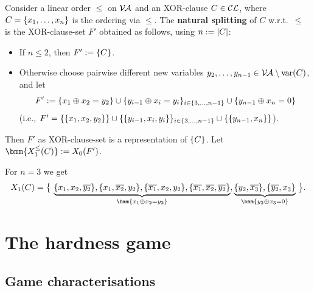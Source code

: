 \documentclass[]{book}
\begin{document}
\begin{defi}\label{def:1softxor}
  \cite{h8} Consider a linear order $\le$ on $\mathcal{V\hspace{-0.1em}A}$ and an XOR-clause $C \in \mathcal{CL}$, where $C = \{ x_1,\dots,x_n \}$ is the ordering via $\le$. 
  The \textbf{natural splitting} of $C$ w.r.t.\ $\le$ is the XOR-clause-set $F'$ obtained as follows, using $n := \lvert C \rvert$:
  \begin{itemize}
  \item If $n \le 2$, then $F' := \{ C \}$.
  \item Otherwise choose pairwise different new variables $y_2, \dots, y_{n-1} \in \mathcal{V\hspace{-0.1em}A} \setminus \operatorname{var}(C)$, and let
    \begin{displaymath}
      F' := \{ x_1 \oplus x_2 = y_2 \} \cup \{ y_{i-1} \oplus x_i = y_i \}_{i \in \{ 3, \dots, n-1 \}} \cup \{ y_{n-1} \oplus x_n = 0 \}
    \end{displaymath}
    (i.e., $F' = \{ \{ x_1,x_2,y_2 \} \} \cup \{ \{ y_{i-1},x_i,y_{i} \} \}_{i \in \{ 3, \dots, n-1 \}} \cup \{ \{ y_{n-1},x_n \} \}$).
  \end{itemize}
  Then $F'$ as XOR-clause-set is a representation of $\{ C \}$. Let $\bmm{X_1^{\le}(C)} := X_0(F')$.
\end{defi}

\begin{examp}\label{exp:xortrans}
  \cite{h8} For $n = 3$ we get
  \begin{displaymath}
    X_1(C) = \setb{ \underbrace{\set{x_1,x_2,\ol{y_2}}, \set{x_1,\ol{x_2},y_2}, \set{\ol{x_1},x_2, y_2}, 
	\set{\ol{x_1},\ol{x_2},\ol{y_2}}}_{\bmm{x_1 \oplus x_2 = y_2}},\underbrace{\set{y_2,\ol{x_3}}, \set{\ol{y_2},x_3} }_{\bmm{y_2 \oplus x_3 = 0}} }.
  \end{displaymath}
\end{examp}

\chapter{The hardness game}
\label{cha:hdgame}

\section{Game characterisations}
\label{sec:game-charc}
\end{document}
